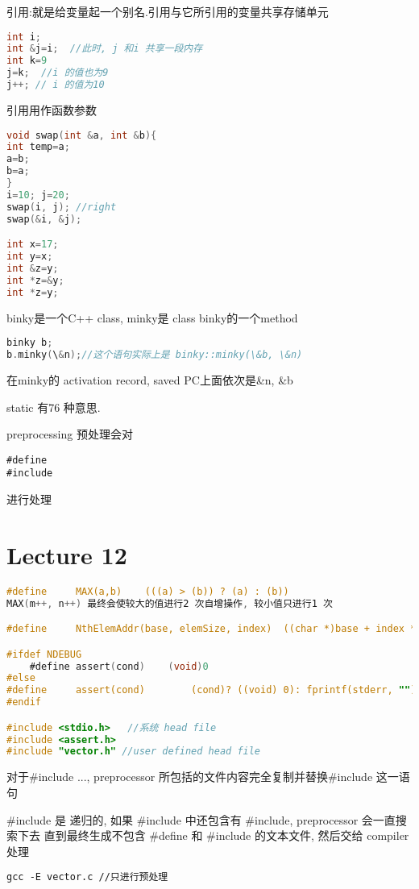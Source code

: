 \documentclass{article}
\begin{document}
引用:就是给变量起一个别名.引用与它所引用的变量共享存储单元
\begin{lstlisting}[language = C]
int i;
int &j=i;  //此时, j 和i 共享一段内存
int k=9
j=k;  //i 的值也为9
j++; // i 的值为10
\end{lstlisting}

引用用作函数参数
\begin{lstlisting}[language = C]
void swap(int &a, int &b){
int temp=a;
a=b;
b=a;
}
i=10; j=20;
swap(i, j); //right
swap(&i, &j); 

int x=17;
int y=x;
int &z=y;
int *z=&y;
int *z=y;
\end{lstlisting}

binky是一个C++ class, minky是 class binky的一个method
\begin{lstlisting}[language = C]
binky b;
b.minky(\&n);//这个语句实际上是 binky::minky(\&b, \&n)
\end{lstlisting}
在minky的 activation record, saved PC上面依次是\&n, \&b

static 有76 种意思.

preprocessing
预处理会对
\begin{verbatim}
#define
#include
\end{verbatim}
进行处理

\section{Lecture 12}
\begin{lstlisting}[language = C]
#define 	MAX(a,b)	(((a) > (b)) ? (a) : (b))
MAX(m++, n++) 最终会使较大的值进行2 次自增操作, 较小值只进行1 次

#define 	NthElemAddr(base, elemSize, index) 	((char *)base + index * elemSize)

#ifdef NDEBUG
	#define assert(cond)	(void)0
#else
#define		assert(cond) 		(cond)? ((void) 0): fprintf(stderr, ""), exit(0)
#endif

#include <stdio.h>   //系统 head file
#include <assert.h> 
#include "vector.h" //user defined head file
\end{lstlisting}
对于\#include ..., preprocessor 所包括的文件内容完全复制并替换\#include  这一语句

\#include 是 递归的, 如果 \#include 中还包含有 \#include, preprocessor 会一直搜索下去
直到最终生成不包含 \#define 和 \#include 的文本文件, 然后交给 compiler 处理

\begin{verbatim}
gcc -E vector.c //只进行预处理
\end{verbatim}
\end{document}
